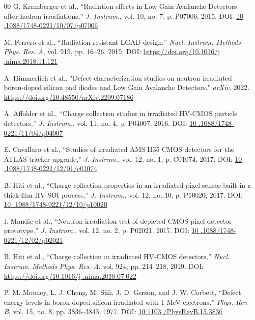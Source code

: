 \documentclass[final, 5p, times]{elsarticle}
\begin{document}
\begin{thebibliography}{00}
 G. Kramberger et al., ``Radiation effects in Low Gain Avalanche
Detectors after hadron irradiations,'' \textit{J. Instrum.}, vol. 10, no. 7, p.
P07006, 2015.
DOI:
\href{https://iopscience.iop.org/article/10.1088/1748-0221/10/07/P07006}{10
.1088/1748-0221/10/07/p07006}

 M. Ferrero et al., ``Radiation resistant LGAD design,''
\textit{Nucl. Instrum. Methods Phys. Res. A}, vol. 919, pp. 16--26, 2019.
DOI:
\href{https://doi.org/10.1016/j.nima.2018.11.121}{https://doi.org/10.1016/j
.nima.2018.11.121}

 A. Himmerlich et al., "Defect characterization studies on neutron irradiated boron-doped silicon pad diodes and Low Gain Avalanche Detectors," \textit{arXiv}, 2022. \href{https://doi.org/10.48550/arXiv.2209.07186}{https://doi.org/10.48550/arXiv.2209.07186}

 A. Affolder et al., ``Charge collection studies in irradiated
HV-CMOS particle detectors,'' \textit{J. Instrum.}, vol. 11, no. 4, p. P04007,
2016.
DOI:
\href{https://iopscience.iop.org/article/10.1088/1748-0221/11/04/P04007}{10
.1088/1748-0221/11/04/p04007}

 E. Cavallaro et al., ``Studies of irradiated AMS H35 CMOS
detectors for the ATLAS tracker upgrade,'' \textit{J. Instrum.}, vol. 12, no.
1, p. C01074, 2017.
DOI:
\href{https://iopscience.iop.org/article/10.1088/1748-0221/12/01/C01074}{10
.1088/1748-0221/12/01/c01074}

 B. Hiti et al., ``Charge collection properties in an irradiated
pixel sensor built in a thick-film HV-SOI process,'' \textit{J. Instrum.}, vol.
12, no. 10, p. P10020, 2017. 
DOI:
\href{https://iopscience.iop.org/article/10.1088/1748-0221/12/10/P10020}{10
.1088/1748-0221/12/10/p10020}

 I. Mandic et al., ``Neutron irradiation test of depleted CMOS
pixel detector prototype,'' \textit{J. Instrum.}, vol. 12, no. 2, p. P02021,
2017.
DOI:
\href{https://iopscience.iop.org/article/10.1088/1748-0221/12/02/P02021}{10
.1088/1748-0221/12/02/p02021}

 B. Hiti et al., ``Charge collection in irradiated HV-CMOS
detectors,'' \textit{Nucl. Instrum. Methods Phys. Res. A}, vol. 924, pp.
214--218, 2019. 
DOI:
\href{https://doi.org/10.1016/j.nima.2018.07.022}{https://doi.org/10.1016/j
.nima.2018.07.022}

 P. M. Mooney, L. J. Cheng, M. S\"uli, J. D. Gerson, and J. W.
Corbett, ``Defect energy levels in boron-doped silicon irradiated with 1-MeV
electrons,'' \textit{Phys. Rev. B}, vol. 15, no. 8, pp. 3836--3843, 1977.
DOI:
\href{https://journals.aps.org/prb/abstract/10.1103/PhysRevB.15.3836}{10.1103
/PhysRevB.15.3836}


\end{thebibliography}
\end{document}
